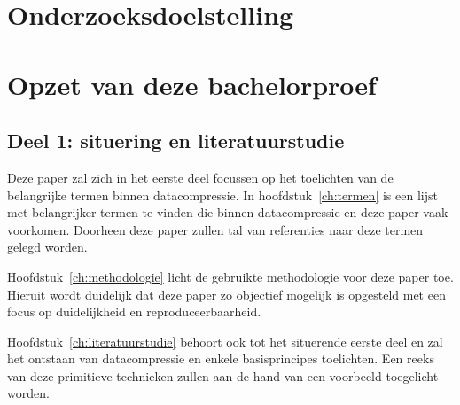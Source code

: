 
\section{Onderzoeksdoelstelling}
\label{sec:onderzoeksdoelstelling}


\section{Opzet van deze bachelorproef}
\label{sec:opzet-bachelorproef}


\subsection{Deel 1: situering en literatuurstudie}
\label{sec:opzet-bachelorproef-deel-1}

Deze paper zal zich in het eerste deel focussen op het toelichten van de belangrijke termen binnen \gls{datacompressie}. In hoofdstuk~\ref{ch:termen} is een lijst met belangrijker termen te vinden die binnen \gls{datacompressie} en deze paper vaak voorkomen. Doorheen deze paper zullen tal van referenties naar deze termen gelegd worden. 

Hoofdstuk~\ref{ch:methodologie} licht de gebruikte methodologie voor deze paper toe. Hieruit wordt duidelijk dat deze paper zo objectief mogelijk is opgesteld met een focus op duidelijkheid en reproduceerbaarheid.

Hoofdstuk~\ref{ch:literatuurstudie} behoort ook tot het situerende eerste deel en zal het ontstaan van \gls{datacompressie} en enkele basisprincipes toelichten. Een reeks van deze primitieve technieken zullen aan de hand van een voorbeeld toegelicht worden.

